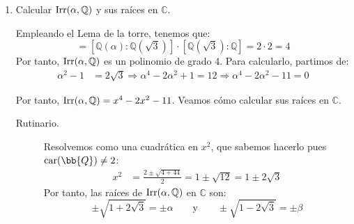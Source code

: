 \begin{ejercicio}
\begin{enumerate}
            Por tanto, tenemos que:
            \begin{equation*}
                \Ex(\iota,\iota\iota) = \{\eta_{0,0},\eta_{0,1},\eta_{1,0},\eta_{1,1}\}
            \end{equation*}
            donde:
            \begin{align*}
                \eta_{j,k}(\sqrt{3}) &= {(-1)}^{j}\sqrt{3} \\
                \eta_{j,k}(\alpha) &= {(-1)}^{k}\sqrt{1+(-1)^{j}2\sqrt{3}}=\begin{cases}
                    {(-1)}^{k}\alpha & j=0 \\
                    {(-1)}^{k}\beta & j=1
                \end{cases}
            \end{align*}

        \item Calcular $\operatorname{Irr}(\alpha,\mathbb{Q})$ y sus raíces en $\mathbb{C}$.
            
            Empleando el Lema de la torre, tenemos que:
            \begin{equation*}
                [\mathbb{Q}(\alpha):\mathbb{Q}] = \left[\mathbb{Q}(\alpha):\mathbb{Q}\left(\sqrt{3}\right)\right]\cdot \left[\mathbb{Q}\left(\sqrt{3}\right):\mathbb{Q}\right] = 2\cdot 2 = 4
            \end{equation*}
            Por tanto, $\operatorname{Irr}(\alpha,\mathbb{Q})$ es un polinomio de grado 4. Para calcularlo, partimos de:
            \begin{align*}
                \alpha^2-1 &= 2\sqrt{3} \Longrightarrow \alpha^4 - 2\alpha^2 + 1 = 12 \Longrightarrow \alpha^4 - 2\alpha^2 - 11 = 0
            \end{align*}

            Por tanto, $\operatorname{Irr}(\alpha,\mathbb{Q}) = x^4-2x^2-11$. Veamos cómo calcular sus raíces en $\mathbb{C}$.
            \begin{description}
                \item[Rutinario.] Resolvemos como una cuadrática en $x^2$, que sabemos hacerlo pues $\car(\bb{Q})\neq 2$:
                \begin{align*}
                    x^2 &= \frac{2\pm \sqrt{4+44}}{2} = 1\pm \sqrt{12} = 1\pm 2\sqrt{3}
                \end{align*}
                Por tanto, las raíces de $\operatorname{Irr}(\alpha,\mathbb{Q})$ en $\mathbb{C}$ son:
                \begin{equation*}
                    \pm \sqrt{1+2\sqrt{3}} = \pm \alpha \qquad\text{y}\qquad \pm \sqrt{1-2\sqrt{3}} = \pm \beta
                \end{equation*}


\end{description}
\end{enumerate}
\end{ejercicio}
